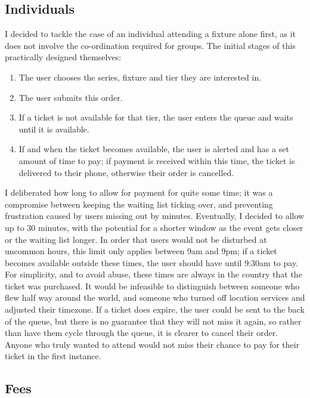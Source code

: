 \documentclass[12pt,a4paper]{bhamdissertation}
\begin{document}
\subsection{Individuals}

I decided to tackle the case of an individual attending a fixture alone first, as it does not involve the co-ordination required for groups. The initial stages of this practically designed themselves:

\begin{enumerate}
    \item The user chooses the series, fixture and tier they are interested in.
    \item The user submits this order.
    \item If a ticket is not available for that tier, the user enters the queue and waits until it is available.
    \item If and when the ticket becomes available, the user is alerted and has a set amount of time to pay; if payment is received within this time, the ticket is delivered to their phone, otherwise their order is cancelled.
\end{enumerate}

I deliberated how long to allow for payment for quite some time; it was a compromise between keeping the waiting list ticking over, and preventing frustration caused by users missing out by minutes. Eventually, I decided to allow up to 30 minutes, with the potential for a shorter window as the event gets closer or the waiting list longer. In order that users would not be disturbed at uncommon hours, this limit only applies between 9am and 9pm; if a ticket becomes available outside these times, the user should have until 9:30am to pay. For simplicity, and to avoid abuse, these times are always in the country that the ticket was purchased. It would be infeasible to distinguish between someone who flew half way around the world, and someone who turned off location services and adjusted their timezone. If a ticket does expire, the user could be sent to the back of the queue, but there is no guarantee that they will not miss it again, so rather than have them cycle through the queue, it is clearer to cancel their order. Anyone who truly wanted to attend would not miss their chance to pay for their ticket in the first instance.

\subsection{Fees}
\end{document}
